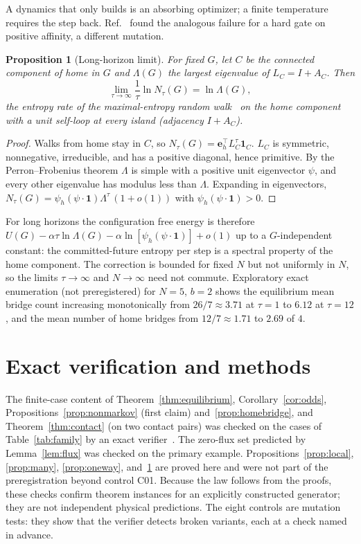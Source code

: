 \documentclass[aps,pre,preprint,superscriptaddress,nofootinbib]{revtex4-2}
\newtheorem{proposition}{Proposition}
\theoremstyle{definition}
\theoremstyle{remark}
\newcommand{\N}{N_\tau}
\begin{document}
A dynamics that only builds is an absorbing optimizer; a finite temperature requires the step back. Ref.~\cite{CALXTHERM} found the analogous failure for a hard gate on positive affinity, a different mutation.

\begin{proposition}[Long-horizon limit]
\label{prop:merw}
For fixed $G$, let $C$ be the connected component of home in $G$ and $\Lambda(G)$ the largest eigenvalue of $L_C=I+A_C$. Then
\begin{equation}
  \lim_{\tau\to\infty}\frac1\tau\ln\N(G)=\ln\Lambda(G),
\end{equation}
the entropy rate of the maximal-entropy random walk~\cite{Parry1964,Burda2009} on the home component with a unit self-loop at every island (adjacency $I+A_C$).
\end{proposition}
\begin{proof}
Walks from home stay in $C$, so $\N(G)=\mathbf e_h^\top L_C^\tau\mathbf 1_C$. $L_C$ is symmetric, nonnegative, irreducible, and has a positive diagonal, hence primitive. By the Perron--Frobenius theorem $\Lambda$ is simple with a positive unit eigenvector $\psi$, and every other eigenvalue has modulus less than $\Lambda$. Expanding in eigenvectors, $\N(G)=\psi_h(\psi\cdot\mathbf 1)\Lambda^\tau\,(1+o(1))$ with $\psi_h(\psi\cdot\mathbf 1)>0$.
\end{proof}

For long horizons the configuration free energy is therefore $U(G)-\alpha\tau\ln\Lambda(G)-\alpha\ln[\psi_h(\psi\cdot\mathbf 1)]+o(1)$ up to a $G$-independent constant: the committed-future entropy per step is a spectral property of the home component. The correction is bounded for fixed $N$ but not uniformly in $N$, so the limits $\tau\to\infty$ and $N\to\infty$ need not commute. Exploratory exact enumeration (not preregistered) for $N=5$, $b=2$ shows the equilibrium mean bridge count increasing monotonically from $26/7\approx3.71$ at $\tau=1$ to $6.12$ at $\tau=12$, and the mean number of home bridges from $12/7\approx1.71$ to $2.69$ of $4$.

\section{Exact verification and methods}
\label{sec:verification}

The finite-case content of Theorem~\ref{thm:equilibrium}, Corollary~\ref{cor:odds}, Propositions~\ref{prop:nonmarkov} (first claim) and~\ref{prop:homebridge}, and Theorem~\ref{thm:contact} (on two contact pairs) was checked on the cases of Table~\ref{tab:family} by an exact verifier~\cite{CALCEF}. The zero-flux set predicted by Lemma~\ref{lem:flux} was checked on the primary example. Propositions~\ref{prop:local}, \ref{prop:many}, \ref{prop:oneway}, and~\ref{prop:merw} are proved here and were not part of the preregistration beyond control C01. Because the law follows from the proofs, these checks confirm theorem instances for an explicitly constructed generator; they are not independent physical predictions. The eight controls are mutation tests: they show that the verifier detects broken variants, each at a check named in advance.
\end{document}
